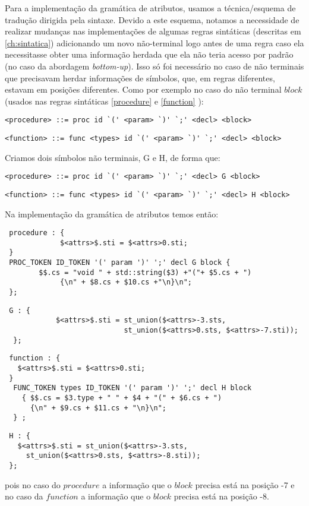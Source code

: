 Para a implementação da gramática de atributos, usamos a técnica/esquema de tradução dirigida pela sintaxe. Devido a este esquema, notamos a necessidade de realizar mudanças nas implementações de algumas regras sintáticas (descritas em \ref{ch:sintatica}) adicionando um novo não-terminal logo antes de uma regra caso ela necessitasse obter uma informação herdada que ela não teria acesso por padrão (no caso da abordagem \textit{bottom-up}). Isso só foi necessário no caso de não terminais que precisavam herdar informações de símbolos, que, em regras diferentes, estavam em posições diferentes. Como por exemplo no caso do não terminal $block$ (usados nas regras sintáticas \ref{procedure} e \ref{function}  ):

\begin{lstlisting}[frame=single, language=pie]
<procedure> ::= proc id `(' <param> `)' `;' <decl> <block>
\end{lstlisting}

\begin{lstlisting}[frame=single, language=pie]
<function> ::= func <types> id `(' <param> `)' `;' <decl> <block>
\end{lstlisting}
 Criamos dois símbolos não terminais, G e H, de forma que:
 \begin{lstlisting}[frame=single, language=pie]
 <procedure> ::= proc id `(' <param> `)' `;' <decl> G <block>
 \end{lstlisting}
 
 \begin{lstlisting}[frame=single, language=pie, basicstyle=\small ]
 <function> ::= func <types> id `(' <param> `)' `;' <decl> H <block>
  \end{lstlisting}
  
  Na implementação da gramática de atributos temos então:
 
 \begin{verbatim}
 procedure : {
 			 $<attrs>$.sti = $<attrs>0.sti; 
 }
 PROC_TOKEN ID_TOKEN '(' param ')' ';' decl G block {
 	  	$$.cs = "void " + std::string($3) +"("+ $5.cs + ") 
 		     {\n" + $8.cs + $10.cs +"\n}\n";
 };
  \end{verbatim}
  \begin{verbatim}
 G : {
		    $<attrs>$.sti = st_union($<attrs>-3.sts,
		                    st_union($<attrs>0.sts, $<attrs>-7.sti)); 
  };
  \end{verbatim}
  \begin{verbatim}
 function : {
   $<attrs>$.sti = $<attrs>0.sti;
 }
  FUNC_TOKEN types ID_TOKEN '(' param ')' ';' decl H block
    { $$.cs = $3.type + " " + $4 + "(" + $6.cs + ")
      {\n" + $9.cs + $11.cs + "\n}\n"; 
  } ;
  \end{verbatim}
  \begin{verbatim}
 H : { 
   $<attrs>$.sti = st_union($<attrs>-3.sts,
     st_union($<attrs>0.sts, $<attrs>-8.sti)); 
 };
 \end{verbatim}
pois no caso do $procedure$ a informação que o $block$ precisa está na posição -7 e no caso da $function$ a informação que o $block$ precisa está na posição -8.